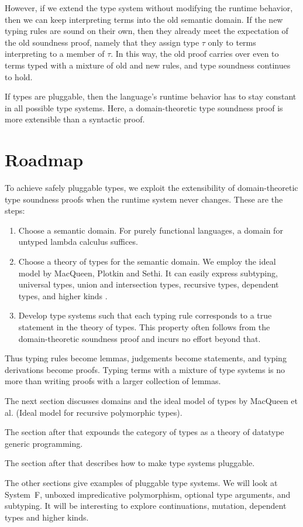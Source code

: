 \documentclass{amsart}
\def\thingsExpressibleInMpsModel{%
subtyping, universal types, union and intersection types,
recursive types, dependent types, and higher kinds%
}
\begin{document}
However, if we extend the type system without modifying the
runtime behavior, then we can keep interpreting terms into the
old semantic domain. If the new typing rules are sound on their
own, then they already meet the expectation of the old soundness
proof, namely that they assign type $\tau$ only to terms
interpreting to a member of $\tau$. In this way, the old proof
carries over even to terms typed with a mixture of old and new
rules, and type soundness continues to hold.

If types are pluggable, then the language's runtime behavior has
to stay constant in all possible type systems. Here, a
domain-theoretic type soundness proof is more extensible than a
syntactic proof.


\section{Roadmap}

To achieve safely pluggable types, we exploit the extensibility
of domain-theoretic type soundness proofs when the runtime system
never changes. These are the steps:
\begin{enumerate}
\item Choose a semantic domain. For purely functional languages,
a domain for untyped lambda calculus suffices.
\item Choose a theory of types for the semantic domain. We employ
the ideal model by MacQueen, Plotkin and Sethi. It can easily
express \thingsExpressibleInMpsModel.
\item Develop type systems such that each typing rule corresponds
to a true statement in the theory of types. This property often
follows from the domain-theoretic soundness proof and incurs no
effort beyond that.
\end{enumerate}
Thus typing rules become lemmas, judgements become statements,
and typing derivations become proofs. Typing terms with a mixture
of type systems is no more than writing proofs with a larger
collection of lemmas.

The next section discusses domains and the ideal model of types
by MacQueen et al. (Ideal model for recursive polymorphic types).

The section after that expounds the category of types as a theory
of datatype generic programming.

The section after that describes how to make type systems
pluggable.

The other sections give examples of pluggable type systems. We
will look at System~F, unboxed impredicative polymorphism,
optional type arguments, and subtyping. It will be interesting to
explore continuations, mutation, dependent types and higher
kinds.
\end{document}
